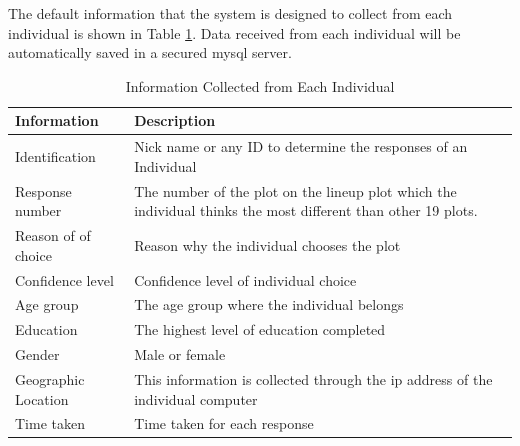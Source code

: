 \documentclass[11pt]{article}
\begin{document}


The default information that the system is designed to collect from each individual is shown in Table \ref{tbl:data_info}. Data received from each individual will be automatically saved in a secured mysql server. 

\begin{table}[hbtp]
\caption{Information Collected from Each Individual}
\centering 
\begin{tabular}{lp{8cm}} 
\hline
Information &  Description \\ %
\hline
Identification & Nick name or any ID to determine the responses of an Individual \\
Response number & The number of the plot on the lineup plot which the individual thinks the most different than other 19 plots.\\ 
Reason of of choice & Reason why the individual chooses the plot \\
Confidence level & Confidence level of individual choice \\ 
Age group& The age group where the individual belongs \\
Education & The highest level of education completed \\
Gender & Male or female \\
Geographic Location & This information is collected through the ip address of the individual computer \\ 
Time taken & Time taken for each response\\
\hline
\end{tabular}
\label{tbl:data_info}
\end{table}	
\end{document}
